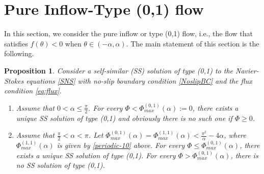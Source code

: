 \documentclass[reqno,12pt]{amsart}
\newtheorem{pro}[theorem]{Proposition}
\begin{document}
\vspace{4mm}
\section{Pure Inflow-Type (0,1) flow}\label{Sectionpureinflow}
In this section, we consider the pure inflow or type (0,1) flow, i.e., the flow that satisfies $f(\theta) <0$ when $\theta \in (-\alpha, \alpha)$. 
The main statement of this section is the following.
\begin{pro}\label{Lemmapureinflow2}
Consider a self-similar (SS) solution of type (0,1) to the Navier-Stokes equations \eqref{SNS} with no-slip boundary condition \eqref{NoslipBC} and the flux condition \eqref{eq:flux}.
\begin{enumerate}
\item  Assume that $0< \alpha \leq \frac{\pi}{2}$. For every $\Phi <\Phi_{max}^{(0,1)}(\alpha):=0$, there exists a {unique} SS solution of type (0,1) and obviously there is no such one if $\Phi \geq 0$.
\item 
Assume that $\frac{\pi}{2} < \alpha < \pi $. Let $\Phi_{max}^{(0,1)}(\alpha)=\Phi_{max}^{(1,1)}(\alpha)<\frac{\pi^2}{\alpha}-4\alpha$, where $\Phi_{max}^{(1,1)}(\alpha)$ is given by \eqref{periodic-10} above.  For every $\Phi \leq \Phi_{max}^{(0,1)}(\alpha)$, there exists a {unique} SS solution of type (0,1).  For every $\Phi > \Phi_{max}^{(0,1)}(\alpha)$, there is no  SS solution of type (0,1). 
\end{enumerate}
\end{pro}

\end{document}
